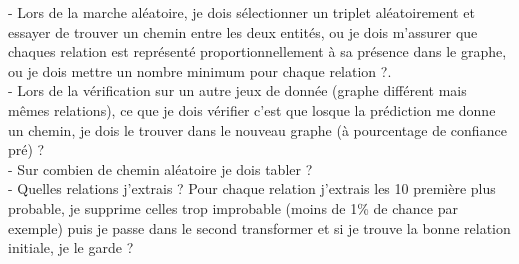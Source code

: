 \documentclass{article}
\begin{document}
- Lors de la marche aléatoire, je dois sélectionner un triplet aléatoirement et essayer de trouver un chemin entre les deux entités, ou je dois m'assurer que chaques relation est représenté proportionnellement à sa présence dans le graphe, ou je dois mettre un nombre minimum pour chaque relation ?.\\
- Lors de la vérification sur un autre jeux de donnée (graphe différent mais mêmes relations), ce que je dois vérifier c'est que losque la prédiction me donne un chemin, je dois le trouver dans le nouveau graphe (à pourcentage de confiance pré) ?\\
- Sur combien de chemin aléatoire je dois tabler ?\\
- Quelles relations j'extrais ? Pour chaque relation j'extrais les 10 première plus probable, je supprime celles trop improbable (moins de 1\% de chance par exemple) puis je passe dans le second transformer et si je trouve la bonne relation initiale, je le garde ?
\end{document}
